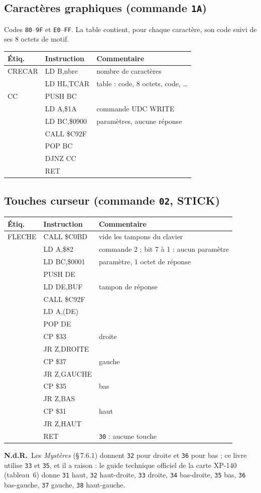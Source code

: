 \documentclass[a4paper,10pt]{article}
\makeatletter
\newcommand{\hex}[1]{\texttt{#1}}
\newcommand{\nota}[1]{\textcolor{red!60!black}{\small\textbf{N.d.R.}~#1}}
\newenvironment{src}
  {\small\begin{longtable}{@{}>{\ttfamily}l>{\ttfamily}l>{\raggedright\arraybackslash}p{8.6cm}@{}}
   \toprule
   \normalfont\bfseries Étiq. & \normalfont\bfseries Instruction & \textbf{Commentaire}\\
   \midrule\endhead
   \bottomrule\endfoot}
  {\end{longtable}}
\makeatother
\begin{document}
\subsection{Caractères graphiques (commande \hex{1A})}
Codes \hex{80}--\hex{9F} et \hex{E0}--\hex{FF}. La table contient, pour chaque
caractère, son code suivi de ses 8 octets de motif.
\begin{src}
CRECAR & LD B,nbre & nombre de caractères \\
 & LD HL,TCAR & table : code, 8 octets, code, \dots \\
CC & PUSH BC & \\
 & LD A,\$1A & commande UDC WRITE \\
 & LD BC,\$0900 & 9 paramètres, aucune réponse \\
 & CALL \$C92F & \\
 & POP BC & \\
 & DJNZ CC & \\
 & RET & \\
\end{src}

\subsection{Touches curseur (commande \hex{02}, STICK)}
\begin{src}
FLECHE & CALL \$C0BD & vide les tampons du clavier \\
 & LD A,\$82 & commande 2 ; bit 7 à 1 : aucun paramètre \\
 & LD BC,\$0001 & 0 paramètre, 1 octet de réponse \\
 & PUSH DE & \\
 & LD DE,BUF & tampon de réponse \\
 & CALL \$C92F & \\
 & LD A,(DE) & \\
 & POP DE & \\
 & CP \$33 & droite \\
 & JR Z,DROITE & \\
 & CP \$37 & gauche \\
 & JR Z,GAUCHE & \\
 & CP \$35 & bas \\
 & JR Z,BAS & \\
 & CP \$31 & haut \\
 & JR Z,HAUT & \\
 & RET & \hex{30} : aucune touche \\
\end{src}
\nota{Les \emph{Mystères} (§\,7.6.1) donnent \hex{32} pour droite et
\hex{36} pour bas ; ce livre utilise \hex{33} et \hex{35}, et il a raison :
le guide technique officiel de la carte XP-140 (tableau~6) donne \hex{31}
haut, \hex{32} haut-droite, \hex{33} droite, \hex{34} bas-droite,
\hex{35} bas, \hex{36} bas-gauche, \hex{37} gauche, \hex{38} haut-gauche.}
\end{document}
